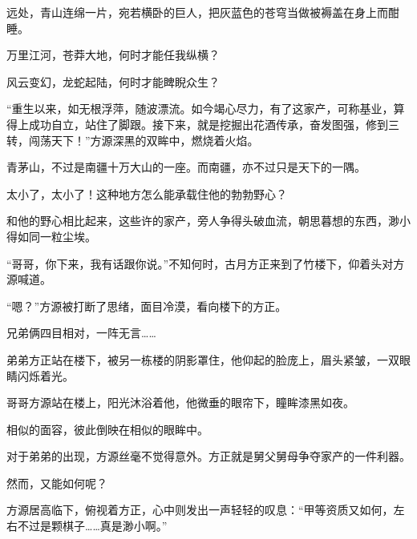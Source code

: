 \begin{this_body}
远处，青山连绵一片，宛若横卧的巨人，把灰蓝色的苍穹当做被褥盖在身上而酣睡。

万里江河，苍莽大地，何时才能任我纵横？

风云变幻，龙蛇起陆，何时才能睥睨众生？

“重生以来，如无根浮萍，随波漂流。如今竭心尽力，有了这家产，可称基业，算得上成功自立，站住了脚跟。接下来，就是挖掘出花酒传承，奋发图强，修到三转，闯荡天下！”方源深黑的双眸中，燃烧着火焰。

青茅山，不过是南疆十万大山的一座。而南疆，亦不过只是天下的一隅。

太小了，太小了！这种地方怎么能承载住他的勃勃野心？

和他的野心相比起来，这些许的家产，旁人争得头破血流，朝思暮想的东西，渺小得如同一粒尘埃。

“哥哥，你下来，我有话跟你说。”不知何时，古月方正来到了竹楼下，仰着头对方源喊道。

“嗯？”方源被打断了思绪，面目冷漠，看向楼下的方正。

兄弟俩四目相对，一阵无言……

弟弟方正站在楼下，被另一栋楼的阴影罩住，他仰起的脸庞上，眉头紧皱，一双眼睛闪烁着光。

哥哥方源站在楼上，阳光沐浴着他，他微垂的眼帘下，瞳眸漆黑如夜。

相似的面容，彼此倒映在相似的眼眸中。

对于弟弟的出现，方源丝毫不觉得意外。方正就是舅父舅母争夺家产的一件利器。

然而，又能如何呢？

方源居高临下，俯视着方正，心中则发出一声轻轻的叹息：“甲等资质又如何，左右不过是颗棋子……真是渺小啊。”

\end{this_body}

